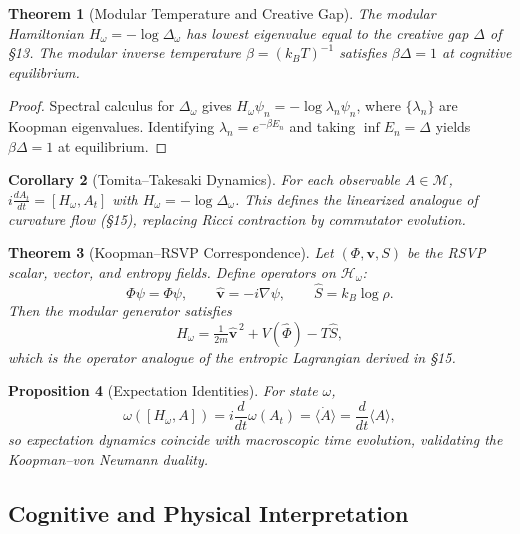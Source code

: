 \documentclass[12pt,a4paper,twoside,openright]{book}
\newtheorem{theorem}{Theorem}
\newtheorem{proposition}[theorem]{Proposition}
\newtheorem{corollary}[theorem]{Corollary}
\begin{document}
\begin{theorem}[Modular Temperature and Creative Gap]
\label{thm:modtemp}
The modular Hamiltonian $H_\omega=-\log\Delta_\omega$ has lowest eigenvalue equal to the creative gap $\Delta$ of §13.  
The modular inverse temperature $\beta=(k_BT)^{-1}$ satisfies $\beta\Delta=1$ at cognitive equilibrium.
\end{theorem}

\begin{proof}
Spectral calculus for $\Delta_\omega$ gives $H_\omega\psi_n=-\log\lambda_n\psi_n$, where $\{\lambda_n\}$ are Koopman eigenvalues.  
Identifying $\lambda_n=e^{-\beta E_n}$ and taking $\inf E_n=\Delta$ yields $\beta\Delta=1$ at equilibrium.
\end{proof}

\begin{corollary}[Tomita--Takesaki Dynamics]
For each observable $A\in\mathcal{M}$,
\(
i\frac{dA_t}{dt}=[H_\omega,A_t]
\)
with $H_\omega=-\log\Delta_\omega$.  
This defines the linearized analogue of curvature flow (§15), replacing Ricci contraction by commutator evolution.
\end{corollary}

\begin{theorem}[Koopman--RSVP Correspondence]
Let $(\Phi,\mathbf{v},S)$ be the RSVP scalar, vector, and entropy fields.
Define operators on $\mathcal{H}_\omega$:
\[
\widehat{\Phi}\psi=\Phi\psi,\qquad
\widehat{\mathbf{v}}=-i\nabla\psi,\qquad
\widehat{S}=k_B\log\rho.
\]
Then the modular generator satisfies
\begin{equation}
H_\omega
 = \tfrac{1}{2m}\widehat{\mathbf{v}}^{\,2}
   + V(\widehat{\Phi})
   - T\widehat{S},
\end{equation}
which is the operator analogue of the entropic Lagrangian derived in §15.  
\end{theorem}

\begin{proposition}[Expectation Identities]
For state $\omega$,
\[
\omega([H_\omega,A]) = i\frac{d}{dt}\omega(A_t)
  = \langle\dot A\rangle
  = \frac{d}{dt}\langle A\rangle,
\]
so expectation dynamics coincide with macroscopic time evolution, validating the Koopman--von Neumann duality.
\end{proposition}

\subsection*{Cognitive and Physical Interpretation}
\end{document}
